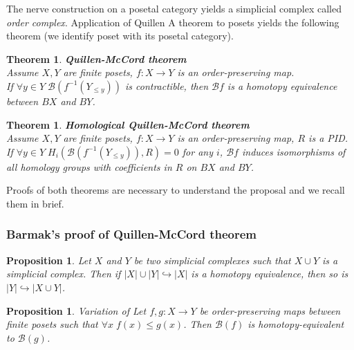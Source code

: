 \documentclass[english,12pt]{article}
\newcounter{stmcounter}[section]
\newcounter{thcounter}
\numberwithin{equation}{section}
\newtheorem{proposition}[stmcounter]{Proposition}
\newtheorem{theorem}[thcounter]{Theorem}
\theoremstyle{definition}
\theoremstyle{remark}
\newcommand{\define}[1]{{\textit{#1}}}
\renewcommand{\leq}{\leqslant}
\begin{document}
The nerve construction on a posetal category yields a simplicial complex called \define{order complex}. Application of Quillen A theorem to posets yields the following theorem (we identify poset with its posetal category).

\begin{theorem} \textbf{Quillen-McCord theorem}\\
  Assume $X, Y$ are finite posets, $f : X \to Y$ is an order-preserving map.\\
  If $\forall y \in Y\;\mathcal{B}(f^{-1}(Y_{\leqslant y}))$ is contractible, then $\mathcal{B}f$ is a homotopy equivalence between $BX$ and $BY$.\\
\end{theorem}

\begin{theorem} \textbf{Homological Quillen-McCord theorem} {\cite[Corollary 5.5]{Bar11}}\\
  Assume $X, Y$ are finite posets, $f : X \to Y$ is an order-preserving map, $R$ is a PID.\\
  If $\forall y \in Y\;H_i(\mathcal{B}(f^{-1}(Y_{\leqslant y})),R) = 0$ for any $i$, $\mathcal{B}f$ induces isomorphisms of all homology groups with coefficients in $R$ on $BX$ and $BY$.\\
\end{theorem}

Proofs of both theorems are necessary to understand the proposal and we recall them in brief.

\subsubsection{Barmak's proof of Quillen-McCord theorem}

\begin{proposition} {\cite[Proposition 2.1]{Bar11}}
  \label{prop:homotopy_t}
  Let $X$ and $Y$ be two simplicial complexes such that $X \cup Y$ is a simplicial complex. Then if $\left|X\right| \cup \left|Y\right| \hookrightarrow \left|X\right|$ is a homotopy equivalence, then so is $\left|Y\right| \hookrightarrow \left|X \cup Y\right|$.
\end{proposition}

\begin{proposition} {Variation of \cite[Proposition 2.2]{Bar11}}
  \label{prop:comparison}
  Let $f,g : X \to Y$ be order-preserving maps between finite posets such that $\forall x\;f(x) \leq g(x)$. Then $\mathcal{B}(f)$ is homotopy-equivalent to $\mathcal{B}(g)$.
\end{proposition}
\end{document}
